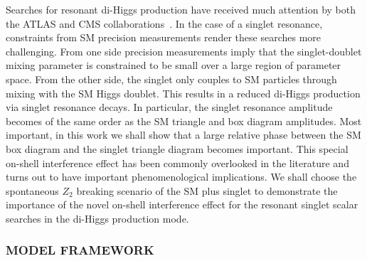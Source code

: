 Searches for resonant di-Higgs production have received much attention by both the ATLAS and CMS collaborations~\cite{Aaboud:2016xco,Aad:2015xja,Sirunyan:2017djm,CMS-PAS-HIG-17-006,CMS-PAS-HIG-17-008,CMS-PAS-HIG-17-009}. In the case of a singlet resonance,  constraints from SM precision measurements  render these searches more challenging. From one side  precision measurements  imply that  the singlet-doublet mixing parameter is constrained to be small over a large region of parameter space.  From the other side, the singlet only couples to SM particles through mixing with the SM Higgs doublet. This results in a reduced di-Higgs production via singlet resonance decays. In particular, the singlet resonance amplitude  becomes of the same order as the SM  triangle  and box diagram amplitudes. Most important, in this work we shall show that a large relative phase between the SM box diagram and the singlet triangle diagram becomes important. This special on-shell interference  effect  has been  commonly overlooked in the literature and turns out to have important phenomenological implications.
We shall choose the spontaneous $Z_2$ breaking scenario of the SM plus singlet to demonstrate the importance of the novel on-shell interference effect for the resonant singlet scalar searches in the di-Higgs production mode.

\subsubsection*{MODEL FRAMEWORK}
\label{sec:model}

